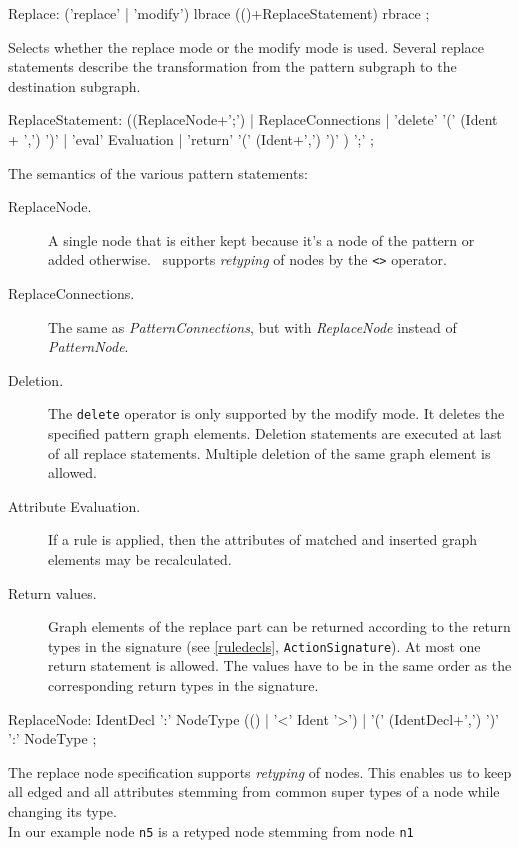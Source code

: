 \begin{rail}
  Replace: ('replace' | 'modify') lbrace (()+ReplaceStatement) rbrace ;
\end{rail}
Selects whether the replace mode or the modify mode is used. Several replace statements describe the transformation from the pattern subgraph to the destination subgraph.

\begin{rail}  
  ReplaceStatement: ((ReplaceNode+';') | 
    ReplaceConnections |
    'delete' '(' (Ident + ',') ')' |
    'eval' Evaluation |
    'return' '(' (Ident+',') ')' ) ';' ;
\end{rail}    
The semantics of the various pattern statements:
\begin{description}
  \item[ReplaceNode.] A single node that is either kept because it's a node of the pattern or added otherwise. \GrG\ supports \emph{retyping} of nodes by the \texttt{<>} operator.
  \item[ReplaceConnections.] The same as \emph{PatternConnections}, but with \emph{ReplaceNode} instead of \emph{PatternNode}.
  \item[Deletion.] The \texttt{delete} operator is only supported by the modify mode. It deletes the specified pattern graph elements. Deletion statements are executed at last of all replace statements. Multiple deletion of the same graph element is allowed.
  \item[Attribute Evaluation.] If a rule is applied, then the attributes of matched and inserted graph elements may be recalculated.
  \item[Return values.] Graph elements of the replace part can be returned according to the return types in the signature (see \ref{ruledecls}, \texttt{ActionSignature}). At most one return statement is allowed. The values have to be in the same order as the corresponding return types in the signature.
\end{description}    
    
\begin{rail}    
    ReplaceNode: IdentDecl ':' NodeType (() | '<' Ident '>') 
    | '(' (IdentDecl+',') ')' ':' NodeType ;
\end{rail}
The replace node specification supports \emph{retyping} of nodes. This enables us to keep all edged and all attributes stemming from common super types of a node while changing its type.\\ 
In our example node \texttt{n5} is a retyped node stemming from node \texttt{n1}

